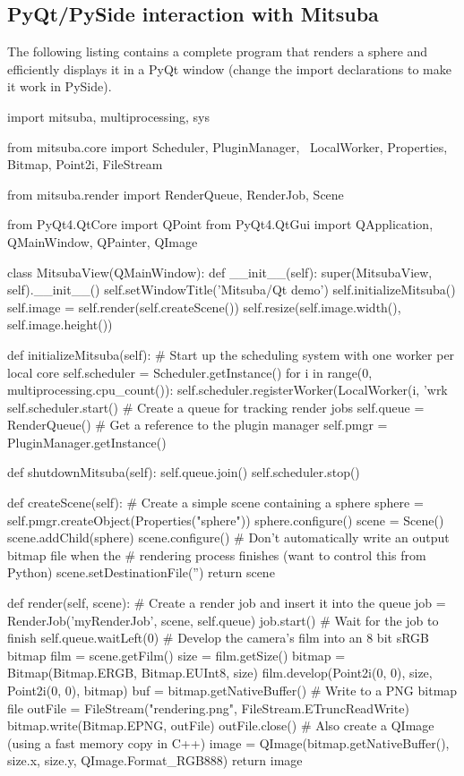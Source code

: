 \subsection{PyQt/PySide interaction with Mitsuba}
The following listing contains a complete program that
renders a sphere and efficiently displays it in a PyQt window
(change the import declarations to make it work in PySide).
\begin{python}
import mitsuba, multiprocessing, sys

from mitsuba.core import Scheduler, PluginManager, \
    LocalWorker, Properties, Bitmap, Point2i, FileStream

from mitsuba.render import RenderQueue, RenderJob, Scene

from PyQt4.QtCore import QPoint
from PyQt4.QtGui import QApplication, QMainWindow, QPainter, QImage

class MitsubaView(QMainWindow):
    def __init__(self):
        super(MitsubaView, self).__init__()
        self.setWindowTitle('Mitsuba/Qt demo')
        self.initializeMitsuba()
        self.image = self.render(self.createScene())
        self.resize(self.image.width(), self.image.height())

    def initializeMitsuba(self):
        # Start up the scheduling system with one worker per local core
        self.scheduler = Scheduler.getInstance()
        for i in range(0, multiprocessing.cpu_count()):
            self.scheduler.registerWorker(LocalWorker(i, 'wrk%
        self.scheduler.start()
        # Create a queue for tracking render jobs
        self.queue = RenderQueue()
        # Get a reference to the plugin manager
        self.pmgr = PluginManager.getInstance()

    def shutdownMitsuba(self):
        self.queue.join()
        self.scheduler.stop()

    def createScene(self):
        # Create a simple scene containing a sphere
        sphere = self.pmgr.createObject(Properties("sphere"))
        sphere.configure()
        scene = Scene()
        scene.addChild(sphere)
        scene.configure()
        # Don't automatically write an output bitmap file when the
        # rendering process finishes (want to control this from Python)
        scene.setDestinationFile('')
        return scene

    def render(self, scene):
        # Create a render job and insert it into the queue
        job = RenderJob('myRenderJob', scene, self.queue)
        job.start()
        # Wait for the job to finish
        self.queue.waitLeft(0)
        # Develop the camera's film into an 8 bit sRGB bitmap
        film = scene.getFilm()
        size = film.getSize()
        bitmap = Bitmap(Bitmap.ERGB, Bitmap.EUInt8, size)
        film.develop(Point2i(0, 0), size, Point2i(0, 0), bitmap)
        buf = bitmap.getNativeBuffer()
        # Write to a PNG bitmap file
        outFile = FileStream("rendering.png", FileStream.ETruncReadWrite)
        bitmap.write(Bitmap.EPNG, outFile)
        outFile.close()
        # Also create a QImage (using a fast memory copy in C++)
        image = QImage(bitmap.getNativeBuffer(),
            size.x, size.y, QImage.Format_RGB888)
        return image


\end{python}
